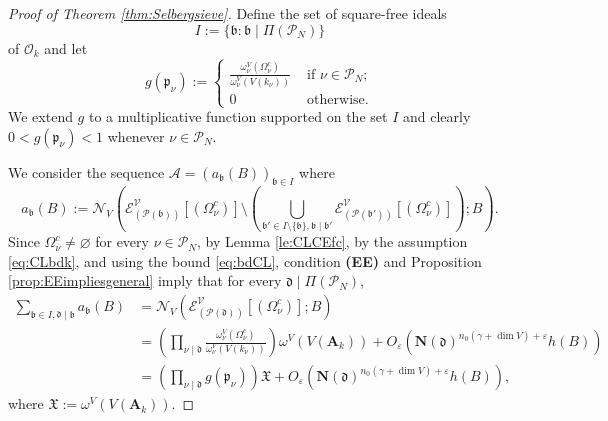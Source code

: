 \documentclass[11pt,letterpaper]{amsart}
\newcommand{\CA}{{\mathcal {A}}}
\newcommand{\CE}{{\mathcal {E}}}
\newcommand{\CN}{{\mathcal {N}}}
\newcommand{\CO}{{\mathcal {O}}}
\newcommand{\CP}{{\mathcal {P}}}
\newcommand{\CV}{{\mathcal {V}}}
\newcommand{\RA}{{\mathbf {A}}}
\theoremstyle{plain}
\numberwithin{equation}{section}
\theoremstyle{definition}
\theoremstyle{remark}
\begin{document}
\begin{proof}[Proof of Theorem \ref{thm:Selbergsieve}]
	Define the set of square-free ideals $$I:=\{\mathfrak{b}:\mathfrak{b}\mid\Pi(\CP_N)\}$$ of $\CO_k$ and let
	$$g(\mathfrak{p}_\nu):=\begin{cases}
		\frac{\omega_\nu^V(\Omega_\nu^c)}{\omega_\nu^V(V(k_\nu))} &\text{ if } \nu\in \CP_N;\\ 0 &\text{ otherwise}.
	\end{cases}$$ We extend $g$ to a multiplicative function supported on the set $I$ and clearly $0<g(\mathfrak{p}_\nu)<1$ whenever $\nu\in\CP_N$.
	
	We consider the sequence $\CA=(a_{\mathfrak{b}}(B))_{\mathfrak{b}\in I}$ where $$a_{\mathfrak{b}}(B):=\CN_V\left(\CE^{\CV}_{(\CP(\mathfrak{b}))}[(\Omega_{\nu}^c)]\setminus\left(\bigcup_{\mathfrak{b}'\in I\setminus\{\mathfrak{b}\},\mathfrak{b}\mid\mathfrak{b}'}\CE^{\CV}_{(\CP(\mathfrak{b}'))}[(\Omega_{\nu}^c)]\right);B\right).$$ 
	Since $\Omega_{\nu}^c\neq\varnothing$ for every $\nu\in \CP_N$, by Lemma \ref{le:CLCEfc}, by the assumption \eqref{eq:CLbdk}, and using the bound \eqref{eq:bdCL}, condition \textbf{(EE)} and Proposition \ref{prop:EEimpliesgeneral} imply that for every $\mathfrak{d}\mid \Pi(\CP_N)$, 
	\begin{equation}\label{eq:sumab}
	\begin{split}
		\sum_{\mathfrak{b}\in I,\mathfrak{d}\mid \mathfrak{b}}a_{\mathfrak{b}}(B)&=\CN_V\left(\CE^{\CV}_{(\CP(\mathfrak{d}))}[(\Omega_{\nu}^c)];B\right)\\ 	&=\left(\prod_{\nu\mid\mathfrak{d}}\frac{\omega_\nu^V(\Omega_\nu^c)}{\omega_\nu^V(V(k_\nu))}\right)\omega^V(V(\RA_k))+O_\varepsilon\left(\mathbf{N}(\mathfrak{d})^{n_0(\gamma+\dim V)+\varepsilon}h(B)\right)\\ &=\left(\prod_{\nu\mid \mathfrak{d}} g(\mathfrak{p}_\nu)\right)\mathfrak{X}+O_\varepsilon\left(\mathbf{N}(\mathfrak{d})^{n_0(\gamma+\dim V)+\varepsilon}h(B)\right),
	\end{split} 	
\end{equation} where $\mathfrak{X}:=\omega^V(V(\RA_k))$.


\end{proof}
\end{document}
